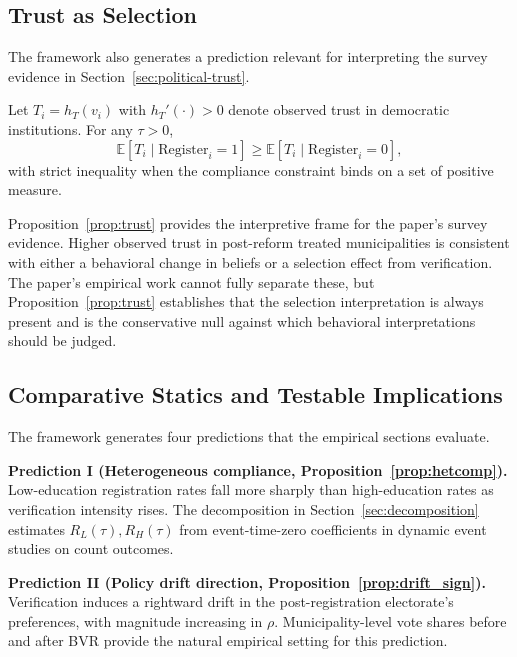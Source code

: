 \subsection{Trust as Selection}
\label{ssec:trust_theory}

The framework also generates a prediction relevant for interpreting the survey evidence in Section~\ref{sec:political-trust}.

\begin{proposition}
\label{prop:trust}
Let $T_i = h_T(v_i)$ with $h_T'(\cdot) > 0$ denote observed trust in democratic institutions. For any $\tau > 0$,
\[
\mathbb{E}[T_i \mid \text{Register}_i = 1] \geq \mathbb{E}[T_i \mid \text{Register}_i = 0],
\]
with strict inequality when the compliance constraint binds on a set of positive measure.
\end{proposition}

Proposition~\ref{prop:trust} provides the interpretive frame for the paper's survey evidence. Higher observed trust in post-reform treated municipalities is consistent with either a behavioral change in beliefs or a selection effect from verification. The paper's empirical work cannot fully separate these, but Proposition~\ref{prop:trust} establishes that the selection interpretation is always present and is the conservative null against which behavioral interpretations should be judged.

\subsection{Comparative Statics and Testable Implications}
\label{ssec:testable}

The framework generates four predictions that the empirical sections evaluate.

\textbf{Prediction I (Heterogeneous compliance, Proposition~\ref{prop:hetcomp}).} Low-education registration rates fall more sharply than high-education rates as verification intensity rises. The decomposition in Section~\ref{sec:decomposition} estimates $R_L(\tau), R_H(\tau)$ from event-time-zero coefficients in dynamic event studies on count outcomes.

\textbf{Prediction II (Policy drift direction, Proposition~\ref{prop:drift_sign}).} Verification induces a rightward drift in the post-registration electorate's preferences, with magnitude increasing in $\rho$. Municipality-level vote shares before and after BVR provide the natural empirical setting for this prediction.

